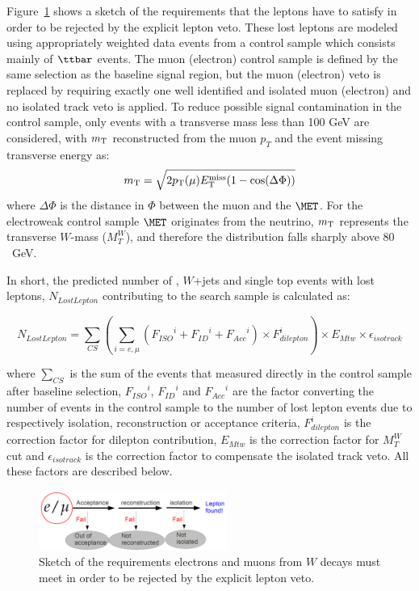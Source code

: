 Figure~\ref{fig:method} shows a sketch of the requirements that the leptons have to satisfy in order to be rejected by the explicit lepton veto. These lost leptons are modeled using appropriately weighted data events from a control sample which consists mainly of $\ttbar$ events. The muon (electron) control sample is defined by the same selection as the baseline signal region, but the muon (electron) veto is replaced by requiring exactly one well identified and isolated muon (electron) and no isolated track veto is applied.
To reduce possible signal contamination in the control sample, only events with a transverse mass less than 100 GeV are considered, with $m_{\rm T}$ reconstructed from the muon $p_{T}$ and the event missing transverse energy as:
\begin{equation}
m_{\rm T} = \sqrt{2 p_{\rm T}(\mu) E^{\rm miss}_{\rm T} (1 - \cos(\Delta \Phi))}
\label{eq:MWT}
\end{equation}
where $\Delta \Phi$ is the distance in $\Phi$ between the muon and the $\MET$. For the electroweak control sample $\MET$ originates from the neutrino, $m_{\rm T}$ represents the transverse $W$-mass ($M_{T}^{W}$), and therefore the distribution falls sharply above $80$~GeV.

In short, the predicted number of \ttbar, $W$+jets and single top events with lost leptons, $N_{LostLepton}$ contributing to the search sample is calculated as:

\begin{equation}
N_{LostLepton}= \sum_{CS} (\sum_{i={e,\mu}}({F_{ISO}}^{i}+{F_{ID}}^{i}+{F_{Acc}}^{i}) \times F_{dilepton}^{i}) \times E_{Mtw} \times \epsilon_{isotrack}
\label{eq:lostleptonequation}
\end{equation}

where $\sum_{CS}$ is the sum of the events that measured directly in the control sample after baseline selection, ${F_{ISO}}^{i}$, ${F_{ID}}^{i}$ and ${F_{Acc}}^{i}$ are the factor converting the number of events in the control sample to the number of lost lepton events due to respectively isolation, reconstruction or acceptance criteria, $F_{dilepton}^{i}$ is the correction factor for dilepton contribution, $E_{Mtw}$ is the correction factor for $M_{T}^{W}$ cut and $\epsilon_{isotrack}$ is the correction factor to compensate the isolated track veto. All these factors are described below.

\begin{figure}[htbp]
\begin{center}
\includegraphics[width=0.55\textwidth]{sections/mc4/Backgrounds/LostLepton/figures/lepton_veto_sketch.png}
\end{center}
\caption{Sketch of the requirements electrons and muons from $W$ decays must meet in order to be rejected by the explicit lepton veto.}
\label{fig:method}
\end{figure}

